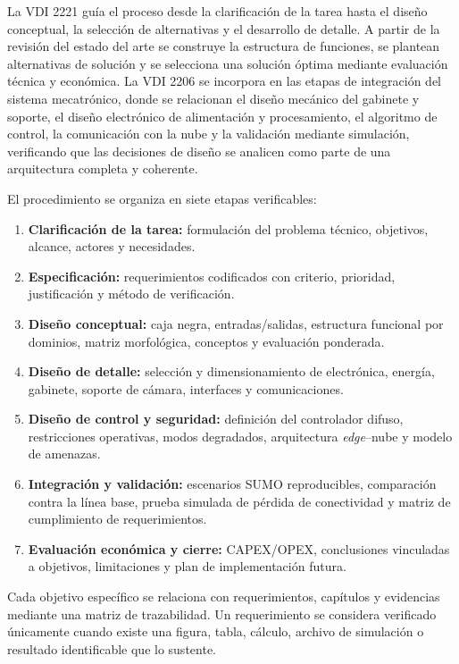 La VDI 2221 guía el proceso desde la clarificación de la tarea hasta el diseño conceptual, la selección de
alternativas y el desarrollo de detalle. A partir de la revisión del estado del arte se construye la
estructura de funciones, se plantean alternativas de solución y se selecciona una solución óptima mediante
evaluación técnica y económica. La VDI 2206 se incorpora en las etapas de integración del sistema
mecatrónico, donde se relacionan el diseño mecánico del gabinete y soporte, el diseño electrónico de
alimentación y procesamiento, el algoritmo de control, la comunicación con la nube y la validación mediante
simulación, verificando que las decisiones de diseño se analicen como parte de una arquitectura completa y
coherente.

El procedimiento se organiza en siete etapas verificables:
\begin{enumerate}
\item \textbf{Clarificación de la tarea:} formulación del problema técnico, objetivos, alcance, actores y
necesidades.
\item \textbf{Especificación:} requerimientos codificados con criterio, prioridad, justificación y método de
verificación.
\item \textbf{Diseño conceptual:} caja negra, entradas/salidas, estructura funcional por dominios, matriz
morfológica, conceptos y evaluación ponderada.
\item \textbf{Diseño de detalle:} selección y dimensionamiento de electrónica, energía, gabinete, soporte de
cámara, interfaces y comunicaciones.
\item \textbf{Diseño de control y seguridad:} definición del controlador difuso, restricciones operativas,
modos degradados, arquitectura \textit{edge}--nube y modelo de amenazas.
\item \textbf{Integración y validación:} escenarios SUMO reproducibles, comparación contra la línea base,
prueba simulada de pérdida de conectividad y matriz de cumplimiento de requerimientos.
\item \textbf{Evaluación económica y cierre:} CAPEX/OPEX, conclusiones vinculadas a objetivos, limitaciones
y plan de implementación futura.
\end{enumerate}

Cada objetivo específico se relaciona con requerimientos, capítulos y evidencias mediante una matriz de
trazabilidad. Un requerimiento se considera verificado únicamente cuando existe una figura, tabla, cálculo,
archivo de simulación o resultado identificable que lo sustente.

